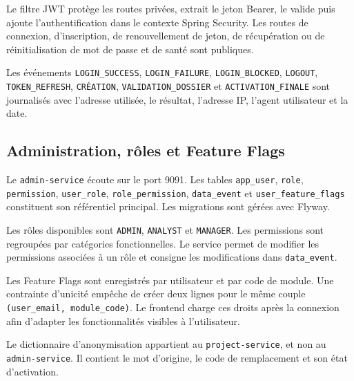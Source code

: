 Le filtre JWT protège les routes privées, extrait le jeton Bearer, le valide puis ajoute l’authentification dans le contexte Spring Security. Les routes de connexion, d’inscription, de renouvellement de jeton, de récupération ou de réinitialisation de mot de passe et de santé sont publiques.

Les événements \texttt{LOGIN\_SUCCESS}, \texttt{LOGIN\_FAILURE}, \texttt{LOGIN\_BLOCKED}, \texttt{LOGOUT}, \texttt{TOKEN\_REFRESH}, \texttt{CRÉATION}, \texttt{VALIDATION\_DOSSIER} et \texttt{ACTIVATION\_FINALE} sont journalisés avec l’adresse utilisée, le résultat, l’adresse IP, l’agent utilisateur et la date.

\subsection{Administration, rôles et Feature Flags}

Le \texttt{admin-service} écoute sur le port 9091. Les tables \texttt{app\_user}, \texttt{role}, \texttt{permission}, \texttt{user\_role}, \texttt{role\_permission}, \texttt{data\_event} et \texttt{user\_feature\_flags} constituent son référentiel principal. Les migrations sont gérées avec Flyway.

Les rôles disponibles sont \texttt{ADMIN}, \texttt{ANALYST} et \texttt{MANAGER}. Les permissions sont regroupées par catégories fonctionnelles. Le service permet de modifier les permissions associées à un rôle et consigne les modifications dans \texttt{data\_event}.

Les Feature Flags sont enregistrés par utilisateur et par code de module. Une contrainte d’unicité empêche de créer deux lignes pour le même couple \texttt{(user\_email, module\_code)}. Le frontend charge ces droits après la connexion afin d’adapter les fonctionnalités visibles à l’utilisateur.

Le dictionnaire d’anonymisation appartient au \texttt{project-service}, et non au \texttt{admin-service}. Il contient le mot d’origine, le code de remplacement et son état d’activation.

